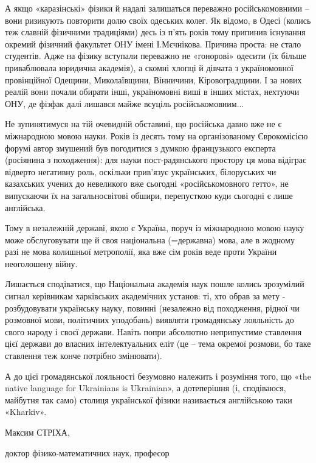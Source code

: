 А якщо «каразінські» фізики й надалі залишаться переважно російськомовними –
вони ризикують повторити долю своїх одеських колег. Як відомо, в Одесі (колись
теж славній фізичними традиціями) десь із п’ять років тому припинив існування
окремий фізичний факультет ОНУ імені І.Мєчнікова. Причина проста: не стало
студентів. Адже на фізику вступали переважно не «гонорові» одесити (їх більше
приваблювала юридична академія), а скомні хлопці й дівчата з україномовної
провінційної Одещини, Миколаївщини, Вінничини, Кіровоградщини. І за нових
реалій вони почали обирати інші, україномовні виші в інших містах, нехтуючи
ОНУ, де фізфак далі лишався майже всуціль російськомовним...

Не зупинятимуся на тій очевидній обставині, що російська давно вже не є
міжнародною мовою науки. Років із десять тому на організованому Єврокомісією
форумі автор змушений був погодитися з думкою французького експерта (росіянина
з походження): для науки пост-радянського простору ця мова відіграє відверто
негативну роль, оскільки прив’язує українських, білоруських чи казахських
учених до невеликого вже сьогодні «російськомовного гетто», не випускаючи їх на
загальносвітові обшири, перепусткою куди сьогодні є лише англійська.

Тому в незалежній державі, якою є Україна, поруч із міжнародною мовою науку
може обслуговувати ще й своя національна (=державна) мова, але в жодному разі
не мова колишньої метрополії, яка вже сім років веде проти України неоголошену
війну. 

Лишається сподіватися, що Національна академія наук пошле колись зрозумілий
сигнал керівникам харківських академічних установ: ті, хто обрав за мету -
розбудовувати українську науку, повинні (незалежно від походження, рідної чи
розмовної мови, політичних уподобань) виявляти громадянську лояльність до свого
народу і своєї держави. Навіть попри абсолютно неприпустиме ставлення цієї
держави до власних інтелектуальних еліт (це – тема окремої розмови, бо таке
ставлення теж конче потрібно змінювати). 

А до цієї громадянської лояльності безумовно належить і розуміння того, що «the
native language for Ukrainians is Ukrainian», а дотеперішня (і, сподіваюся,
майбутня так само) столиця української фізики називається англійською таки
«Kharkiv».

Максим СТРІХА,

доктор фізико-математичних наук, професор
